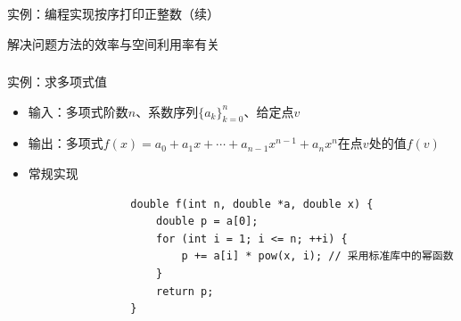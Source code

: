 \begin{fragile}
	\frametitle{\insertsubsectionhead}
	\begin{exampleblock}{实例：编程实现按序打印正整数（续）}
		\vspace{2ex}
	\end{exampleblock}
\end{fragile}

\begin{standout}[\insertsubsectionhead]
	解决问题方法的效率与\alert{空间利用率}有关
\end{standout}

\begin{fragile}
	\frametitle{\insertsubsectionhead}
	\begin{exampleblock}{实例：求多项式值}
		\begin{itemize}
			\item 输入：多项式阶数$n$、系数序列$\{a_{k}\}_{k=0}^{n}$、给定点$v$
			\item 输出：多项式$f(x) = a_{0} + a_{1}x + \cdots + a_{n-1}x^{n-1} + a_{n}x^{n}$在点$v$处的值$f(v)$
			\item<2-> 常规实现
			      \begin{verbatim}
                double f(int n, double *a, double x) {
                    double p = a[0];
                    for (int i = 1; i <= n; ++i) {
                        p += a[i] * pow(x, i); // 采用标准库中的幂函数
                    }
                    return p;
                }
            \end{verbatim}
		\end{itemize}
	\end{exampleblock}
\end{fragile}

